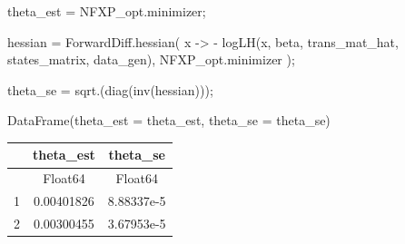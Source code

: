 \documentclass[
  letterpaper,
  DIV=11,
  numbers=noendperiod]{scrreprt}
\newenvironment{Shaded}{\begin{snugshade}}{\end{snugshade}}
\newcommand{\FunctionTok}[1]{\textcolor[rgb]{0.28,0.35,0.67}{#1}}
\newcommand{\NormalTok}[1]{\textcolor[rgb]{0.00,0.23,0.31}{#1}}
\newcommand{\OperatorTok}[1]{\textcolor[rgb]{0.37,0.37,0.37}{#1}}
\begin{document}
\begin{Shaded}
\begin{Highlighting}[]
\NormalTok{theta\_est }\OperatorTok{=}\NormalTok{ NFXP\_opt.minimizer;}

\NormalTok{hessian }\OperatorTok{=}\NormalTok{ ForwardDiff.}\FunctionTok{hessian}\NormalTok{(}
\NormalTok{    x }\OperatorTok{{-}\textgreater{}} \OperatorTok{{-}} \FunctionTok{logLH}\NormalTok{(x, beta, trans\_mat\_hat, states\_matrix, data\_gen),}
\NormalTok{    NFXP\_opt.minimizer}
\NormalTok{    );}

\NormalTok{theta\_se }\OperatorTok{=} \FunctionTok{sqrt}\NormalTok{.(}\FunctionTok{diag}\NormalTok{(}\FunctionTok{inv}\NormalTok{(hessian)));}
\end{Highlighting}
\end{Shaded}

\begin{Shaded}
\begin{Highlighting}[]
\FunctionTok{DataFrame}\NormalTok{(theta\_est }\OperatorTok{=}\NormalTok{ theta\_est, theta\_se }\OperatorTok{=}\NormalTok{ theta\_se)}
\end{Highlighting}
\end{Shaded}

\begin{tabular}{r|cc}
    & theta\_est & theta\_se\\
    \hline
    & Float64 & Float64\\
    \hline
    1 & 0.00401826 & 8.88337e-5 \\
    2 & 0.00300455 & 3.67953e-5 \\
\end{tabular}
\end{document}
